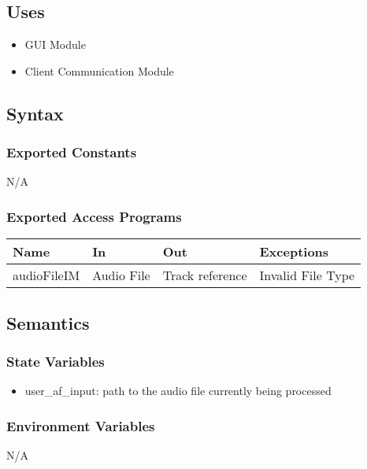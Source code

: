 \documentclass[12pt, titlepage]{article}
\begin{document}
\subsection{Uses}
\begin{itemize}
  \item GUI Module
  \item Client Communication Module
\end{itemize}

\subsection{Syntax}

\subsubsection{Exported Constants}
N/A

\subsubsection{Exported Access Programs}

\begin{center}
\begin{tabular}{p{2cm} p{4cm} p{4cm} p{2cm}}
\hline
\textbf{Name} & \textbf{In} & \textbf{Out} & \textbf{Exceptions}\\
\hline%
audioFileIM &Audio File &Track reference &Invalid File Type\\

\hline
\end{tabular}
\end{center}

\subsection{Semantics}

\subsubsection{State Variables}
\begin{itemize}
  \item user\_af\_input: path to the audio file currently being processed
\end{itemize}

\subsubsection{Environment Variables}
N/A 
\end{document}
